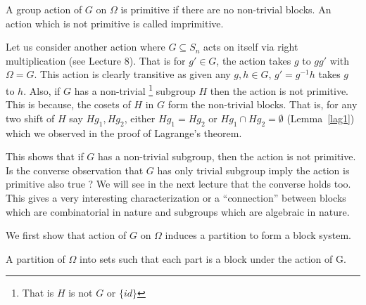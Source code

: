 \begin{definition}
	A group action of $G$ on $\Omega$ is primitive if there are no
	non-trivial blocks. An action which is not primitive is called
	imprimitive.
\end{definition}

Let us consider another action where $G \subseteq S_n$ acts on itself via
right multiplication (see Lecture 8). That is for $g' \in G$, the action
takes $g$ to $gg'$ with $\Omega = G$. This action is clearly transitive as
given any $g,h \in G$, $g' = g^{-1}h$ takes $g$ to $h$. Also, if $G$ has a 
non-trivial \footnote{That is $H$ is not $G$ or $\{id\}$} subgroup $H$ then
the action is not primitive.  This is because, the cosets of $H$ in $G$ form 
the non-trivial blocks. That is, for any two shift of $H$ say $Hg_1, Hg_2$,
either $Hg_1 = Hg_2$ or $Hg_1 \cap Hg_2 = \emptyset$ (Lemma~\ref{lag1}) which
we observed in the proof of Lagrange's theorem.

This shows that if $G$ has a non-trivial subgroup, then the action is not
primitive. Is the converse observation that $G$ has only trivial
subgroup imply the action is primitive also true ? We will see in the next 
lecture that the converse holds too. This gives a very interesting
characterization or a ``connection'' between blocks which are combinatorial in
nature and subgroups which are algebraic in nature.

We first show that action of $G$ on $\Omega$ induces a partition to form a
block system.

\begin{definition}
A partition of $\Omega$ into sets such that each part is a block under the action of G.
\end{definition}

